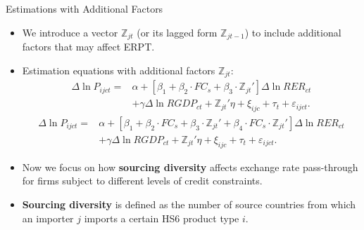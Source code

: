 \documentclass[10pt]{beamer}
\begin{document}
\begin{frame}{Estimations with Additional Factors}
    \begin{itemize}
        \item We introduce a vector $\mathbb{Z}_{jt}$ (or its lagged form $\mathbb{Z}_{jt-1}$) to include additional factors that may affect ERPT.
	\item Estimation equations with additional factors $\mathbb{Z}_{jt}$:
	\begin{equation}
		\begin{aligned}
			\Delta \ln P_{ijct}=&\alpha+[\beta_{1}+ \beta_{2} \cdot FC_{s}+\beta_{3} \cdot {\mathbb{Z}_{jt}}'] \Delta \ln RER_{ct} \\&+\gamma \Delta \ln RGDP_{ct}+ {\mathbb{Z}_{jt}}' \eta+\xi_{ijc}+\tau_{t} +\varepsilon_{ijct}.
		\end{aligned}	
		\label{eq.add.control}
	\end{equation}
	\begin{equation}
		\begin{aligned}
			\Delta \ln P_{ijct}=&\alpha+[\beta_{1}+ \beta_{2} \cdot FC_{s}+\beta_{3} \cdot {\mathbb{Z}_{jt}}'+\beta_{4} \cdot FC_{s} \cdot {\mathbb{Z}_{jt}}'] \Delta \ln RER_{ct} \\ &+\gamma \Delta \ln RGDP_{ct}+ {\mathbb{Z}_{jt}}' \eta+\xi_{ijc}+\tau_{t} +\varepsilon_{ijct}.
		\end{aligned}	
		\label{eq.add.interaction}
	\end{equation}
	\item Now we focus on how \textbf{sourcing diversity} affects exchange rate pass-through for firms subject to different levels of credit constraints.
        \item \textbf{Sourcing diversity} is defined as the number of source countries from which an importer $j$ imports a certain HS6 product type $i$.
    \end{itemize}
\end{frame}
\end{document}
